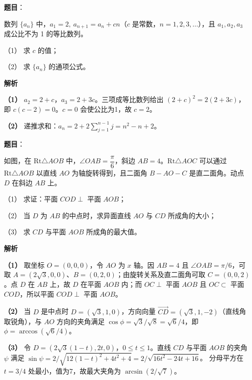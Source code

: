 \begin{answer}

\textbf{题目}：

数列 $\{a_n\}$ 中，$a_1=2,\ a_{n+1}=a_n+cn$（$c$ 是常数，$n=1,2,3,\ldots$），且 $a_1,a_2,a_3$ 成公比不为 1 的等比数列。

（1） 求 $c$ 的值；

（2） 求 $\{a_n\}$ 的通项公式。

\textbf{解析}

\textbf{（1）} $a_2=2+c$，$a_3=2+3c$。三项成等比数列给出 $(2+c)^2=2(2+3c)$，即 $c(c-2)=0$。$c=0$ 会使公比为1，故 $c=2$。

\textbf{（2）} 递推求和：$a_n=2+2\sum_{j=1}^{n-1}j=n^2-n+2$。



\end{answer}
\begin{answer}

\textbf{题目}：

如图，在 $\mathrm{Rt}\triangle AOB$ 中，$\angle OAB=\dfrac{\pi}{6}$，斜边 $AB=4$。$\mathrm{Rt}\triangle AOC$ 可以通过 $\mathrm{Rt}\triangle AOB$ 以直线 $AO$ 为轴旋转得到，且二面角 $B-AO-C$ 是直二面角。动点 $D$ 在斜边 $AB$ 上。

（1） 求证：平面 $COD\perp$ 平面 $AOB$；

（2） 当 $D$ 为 $AB$ 的中点时，求异面直线 $AO$ 与 $CD$ 所成角的大小；

（3） 求 $CD$ 与平面 $AOB$ 所成角的最大值。
\nopagebreak[4]
\begin{center}\end{center}
\nopagebreak[4]
\textbf{解析}

\textbf{（1）} 取坐标 $O=(0,0,0)$，令 $AO$ 为 $x$ 轴。因 $AB=4$ 且 $\angle OAB=\pi/6$，可取 $A=(2\sqrt3,0,0)$、$B=(0,2,0)$；由旋转关系及直二面角可取 $C=(0,0,2)$。点 $D$ 在 $AB$ 上，故 $D$ 在平面 $AOB$ 内；而 $OC\perp$ 平面 $AOB$ 且 $OC\subset$ 平面 $COD$，所以平面 $COD\perp$ 平面 $AOB$。

\textbf{（2）} 当 $D$ 是中点时 $D=(\sqrt3,1,0)$，方向向量 $\overrightarrow{CD}=(\sqrt3,1,-2)$（直线角取锐角），与 $AO$ 方向的夹角满足
$\cos\phi=\sqrt3/\sqrt8=\sqrt6/4$，即 $\phi=\arccos(\sqrt6/4)$。

\textbf{（3）} 令 $D=(2\sqrt3(1-t),2t,0)$，$0\le t\le1$。直线 $CD$ 与平面 $AOB$ 的夹角 $\psi$ 满足
$\sin\psi=2/\sqrt{12(1-t)^2+4t^2+4}=2/\sqrt{16t^2-24t+16}$。
分母平方在 $t=3/4$ 处最小，值为7，故最大夹角为 $\arcsin(2/\sqrt7)$。




\end{answer}
